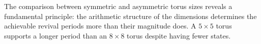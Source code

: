 The comparison between symmetric and asymmetric torus sizes reveals a
fundamental principle: the arithmetic structure of the dimensions
determines the achievable revival periods more than their magnitude
does. A $5 \times 5$ torus supports a longer period than an
$8 \times 8$ torus despite having fewer states.
